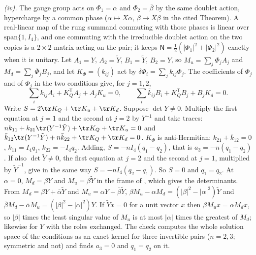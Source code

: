 \emph{(iv).} The gauge group acts on $\Phi_{1} = \alpha$ and $\Phi_{2} = \bar\beta$ by the same doublet action, hypercharge by a common phase ($\alpha \mapsto X\alpha$, $\beta \mapsto \bar{X}\beta$ in the cited Theorem). A real-linear map of the rung summand commuting with those phases is linear over $\mathrm{span}\{1, I_{4}\}$, and one commuting with the irreducible doublet action on the two copies is a $2 \times 2$ matrix acting on the pair; it keeps $\mathsf{N} = \tfrac12(|\Phi_{1}|^{2} + |\Phi_{2}|^{2})$ exactly when it is unitary. Let $A_{1} = Y$, $A_{2} = \tilde{Y}$, $B_{1} = \tilde{Y}$, $B_{2} = Y$, so $M_{u} = \sum_{j}\Phi_{j}A_{j}$ and $M_{d} = \sum_{j}\bar\Phi_{j}B_{j}$, and let $K_{\Phi} = (k_{ij})$ act by $\delta\Phi_{i} = \sum_{j}k_{ij}\Phi_{j}$. The coefficients of $\Phi_{j}$ and of $\bar\Phi_{j}$ in the two conditions give, for $j = 1, 2$,
\[
\textstyle\sum_{i}k_{ij}A_{i} + K_{Q}^{\mathsf T}A_{j} + A_{j}K_{u} = 0, \qquad \sum_{i}\bar{k}_{ij}B_{i} + K_{Q}^{\mathsf T}B_{j} + B_{j}K_{d} = 0 .
\]
Write $S = 2\tr K_{Q} + \tr K_{u} + \tr K_{d}$. Suppose $\det Y \neq 0$. Multiply the first equation at $j = 1$ and the second at $j = 2$ by $Y^{-1}$ and take traces: $nk_{11} + k_{21}\tr(Y^{-1}\tilde{Y}) + \tr K_{Q} + \tr K_{u} = 0$ and $\bar{k}_{12}\tr(Y^{-1}\tilde{Y}) + n\bar{k}_{22} + \tr K_{Q} + \tr K_{d} = 0$. $K_{\Phi}$ is anti-Hermitian: $k_{21} + \bar{k}_{12} = 0$, $k_{11} = I_{4}q_{1}$, $\bar{k}_{22} = -I_{4}q_{2}$. Adding, $S = -nI_{4}(q_{1} - q_{2})$, that is $a_{3} = -n(q_{1} - q_{2})$. If also $\det\tilde{Y} \neq 0$, the first equation at $j = 2$ and the second at $j = 1$, multiplied by $\tilde{Y}^{-1}$, give in the same way $S = -nI_{4}(q_{2} - q_{1})$. So $S = 0$ and $q_{1} = q_{2}$. At $\alpha = 0$, $M_{d} = \beta Y$ and $M_{u} = \bar\beta\tilde{Y}$ in the frame of , which gives the determinants. From $M_{d} = \beta Y + \bar\alpha\tilde{Y}$ and $M_{u} = \alpha Y + \bar\beta\tilde{Y}$, $\beta M_{u} - \alpha M_{d} = (|\beta|^{2} - |\alpha|^{2})\tilde{Y}$ and $\bar\beta M_{d} - \bar\alpha M_{u} = (|\beta|^{2} - |\alpha|^{2})Y$. If $\tilde{Y}x = 0$ for a unit vector $x$ then $\beta M_{u}x = \alpha M_{d}x$, so $|\beta|$ times the least singular value of $M_{u}$ is at most $|\alpha|$ times the greatest of $M_{d}$; likewise for $Y$ with the roles exchanged. The check computes the whole solution space of the conditions as an exact kernel for three invertible pairs ($n = 2, 3$; symmetric and not) and finds $a_{3} = 0$ and $q_{1} = q_{2}$ on it.

